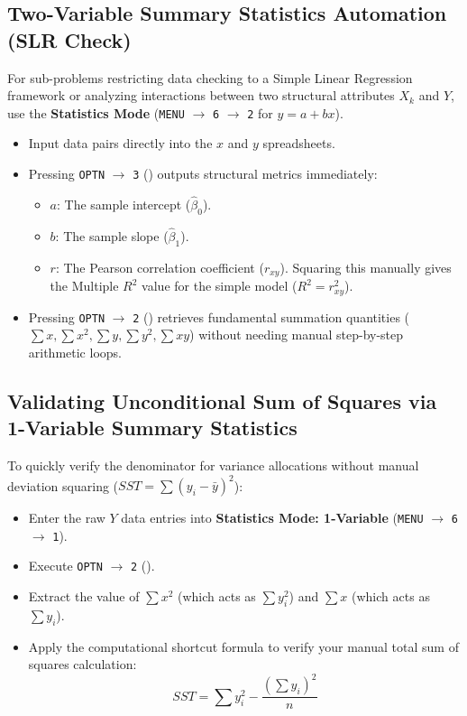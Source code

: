 \documentclass{article}
\begin{document}
\subsection{Two-Variable Summary Statistics Automation (SLR Check)}
For sub-problems restricting data checking to a Simple Linear Regression framework or analyzing interactions between two structural attributes $X_k$ and $Y$, use the \textbf{Statistics Mode} (\texttt{MENU} $\rightarrow$ \texttt{6} $\rightarrow$ \texttt{2} for $y=a+bx$).
\begin{itemize}
    \item Input data pairs directly into the $x$ and $y$ spreadsheets.
    \item Pressing \texttt{OPTN} $\rightarrow$ \texttt{3} () outputs structural metrics immediately:
    \begin{itemize}
        \item $a$: The sample intercept ($\hat{\beta}_0$).
        \item $b$: The sample slope ($\hat{\beta}_1$).
        \item $r$: The Pearson correlation coefficient ($r_{xy}$). Squaring this manually gives the Multiple $R^2$ value for the simple model ($R^2 = r_{xy}^2$).
    \end{itemize}
    \item Pressing \texttt{OPTN} $\rightarrow$ \texttt{2} () retrieves fundamental summation quantities ($\sum x, \sum x^2, \sum y, \sum y^2, \sum xy$) without needing manual step-by-step arithmetic loops.
\end{itemize}

\subsection{Validating Unconditional Sum of Squares via 1-Variable Summary Statistics}
To quickly verify the denominator for variance allocations without manual deviation squaring ($SST = \sum (y_i - \bar{y})^2$):
\begin{itemize}
    \item Enter the raw $Y$ data entries into \textbf{Statistics Mode: 1-Variable} (\texttt{MENU} $\rightarrow$ \texttt{6} $\rightarrow$ \texttt{1}).
    \item Execute \texttt{OPTN} $\rightarrow$ \texttt{2} ().
    \item Extract the value of $\sum x^2$ (which acts as $\sum y_i^2$) and $\sum x$ (which acts as $\sum y_i$).
    \item Apply the computational shortcut formula to verify your manual total sum of squares calculation:
    $$SST = \sum y_i^2 - \frac{(\sum y_i)^2}{n}$$
\end{itemize}
\end{document}
